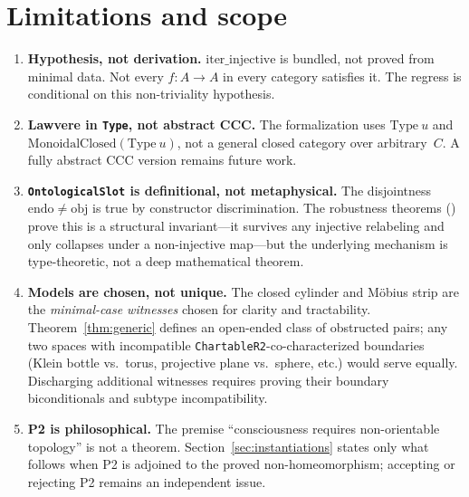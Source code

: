 \documentclass[11pt]{article}
\begin{document}
\section{Limitations and scope}
\label{sec:limits}

\begin{enumerate}
\item \textbf{Hypothesis, not derivation.} $\mathrm{iter\_injective}$ is bundled,
  not proved from minimal data. Not every $f : A \to A$ in every category satisfies it.
  The regress is conditional on this non-triviality hypothesis.

\item \textbf{Lawvere in \texttt{Type}, not abstract CCC.} The formalization uses
  $\mathrm{Type}\ u$ and\newline
  $\mathrm{MonoidalClosed}(\mathrm{Type}\ u)$, not a general closed category over arbitrary~$C$.
  A fully abstract CCC version remains future work.

\item \textbf{\texttt{OntologicalSlot} is definitional, not metaphysical.} The disjointness $\mathrm{endo} \neq \mathrm{obj}$ is true by constructor discrimination. The robustness theorems () prove this is a structural invariant---it survives any injective relabeling and only collapses under a non-injective map---but the underlying mechanism is type-theoretic, not a deep mathematical theorem.

\item \textbf{Models are chosen, not unique.} The closed cylinder and M\"obius strip are the \emph{minimal-case witnesses} chosen for clarity and tractability.  Theorem~\ref{thm:generic} defines an open-ended class of obstructed pairs; any two spaces with incompatible \texttt{ChartableR2}-co-characterized boundaries (Klein bottle vs.\ torus, projective plane vs.\ sphere, etc.) would serve equally.  Discharging additional witnesses requires proving their boundary biconditionals and subtype incompatibility.

\item \textbf{P2 is philosophical.} The premise ``consciousness requires non-orientable topology'' is not a theorem. Section~\ref{sec:instantiations} states only what follows when P2 is adjoined to the proved non-homeomorphism; accepting or rejecting P2 remains an independent issue.


\end{enumerate}
\end{document}
